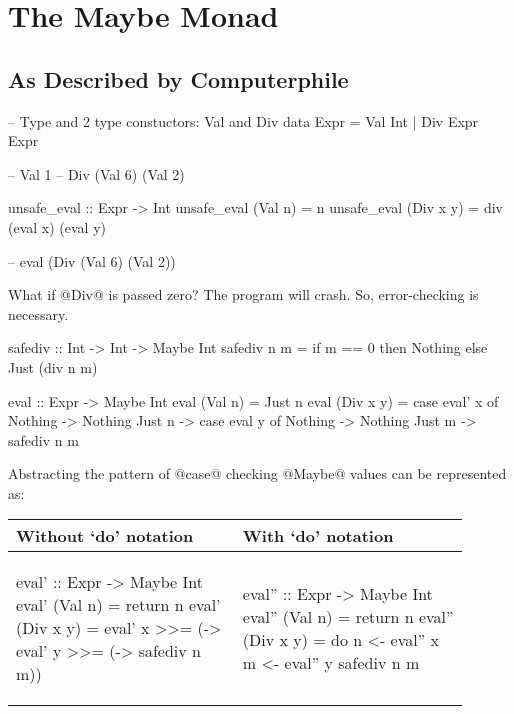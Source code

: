 \chapter{The Maybe Monad}

\section{As Described by Computerphile}

\autocite{hutton:computerphile}

\begin{code}
-- Type and 2 type constuctors: Val and Div
data Expr = Val Int | Div Expr Expr

-- Val 1
-- Div (Val 6) (Val 2)

unsafe_eval :: Expr -> Int
unsafe_eval (Val n) = n
unsafe_eval (Div x y) = div (eval x) (eval y)

-- eval (Div (Val 6) (Val 2))
\end{code}

What if @Div@ is passed zero?  The program will crash. So, error-checking is
necessary.

\begin{code}
safediv :: Int -> Int -> Maybe Int
safediv n m = if m == 0 then Nothing else Just (div n m)

eval :: Expr -> Maybe Int
eval (Val n)   = Just n
eval (Div x y) = case eval' x of
                   Nothing -> Nothing
                   Just n  -> case eval y of
                             Nothing -> Nothing
                             Just m  -> safediv n m
\end{code}

Abstracting the pattern of @case@ checking @Maybe@ values can be represented
as:

\begin{table}[h]
\begin{tabular}[b]{p{0.45\linewidth} | p{0.45\linewidth}}
\hline
Without `do' notation & With `do' notation \\ \hline
\begin{code}
eval' :: Expr -> Maybe Int
eval' (Val n)   = return n
eval' (Div x y) =
  eval' x >>= (\n ->
    eval' y >>= (\m ->
      safediv n m))
\end{code} &
\begin{code}
eval'' :: Expr -> Maybe Int
eval'' (Val n)   = return n
eval'' (Div x y) = do
  n <- eval'' x
  m <- eval'' y
  safediv n m
\end{code}
\end{tabular}
\end{table}
